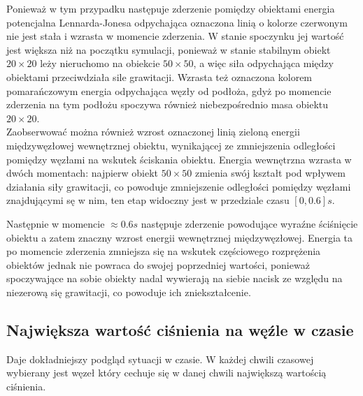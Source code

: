 \documentclass[12pt, letterpaper]{report}
\begin{document}
    Ponieważ w tym przypadku następuje zderzenie pomiędzy obiektami energia potencjalna Lennarda-Jonesa odpychająca
    oznaczona linią o kolorze czerwonym nie jest stała i wzrasta w momencie zderzenia. W stanie spoczynku jej wartość
    jest większa niż na początku symulacji, ponieważ w stanie stabilnym obiekt $20 \times 20$ leży nieruchomo na obiekcie
    $50 \times 50$, a więc siła odpychająca między obiektami przeciwdziała sile grawitacji. 
    Wzrasta też oznaczona kolorem pomarańczowym energia odpychająca węzły od podłoża, gdyż po momencie zderzenia na 
    tym podłożu spoczywa również niebezpośrednio masa  obiektu $20 \times 20$. \\
    
    Zaobserwować można również wzrost oznaczonej linią zieloną energii międzywęzłowej wewnętrznej obiektu, wynikającej ze 
    zmniejszenia odległości pomiędzy węzłami na wskutek ściskania obiektu. Energia wewnętrzna wzrasta w dwóch momentach: 
    najpierw obiekt $50 \times 50$ zmienia swój kształt pod wpływem działania siły grawitacji, co powoduje zmniejszenie 
    odległości pomiędzy węzłami znajdującymi sę w nim, ten etap widoczny jest w przedziale czasu $[0, 0.6] s$. 
    
    Następnie w momencie $\approx 0.6 s$ następuje zderzenie powodujące wyraźne ściśnięcie obiektu a zatem znaczny wzrost
    energii wewnętrznej międzywęzłowej. Energia ta po momencie zderzenia zmniejsza się na wskutek częściowego rozprężenia
    obiektów jednak nie powraca do swojej poprzedniej wartości, ponieważ spoczywające na sobie obiekty nadal 
    wywierają na siebie nacisk ze względu na niezerową się grawitacji, co powoduje ich zniekształcenie.

    \clearpage
    \subsection{Największa wartość ciśnienia na węźle w czasie}
    Daje dokładniejszy podgląd sytuacji w czasie. W każdej chwili czasowej wybierany jest węzeł 
    który cechuje się w danej chwili największą wartością ciśnienia.
\end{document}
